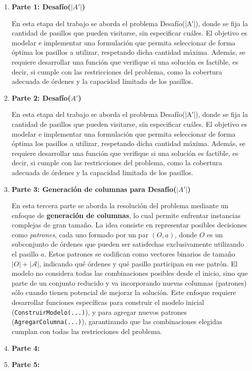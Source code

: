 \documentclass[a4paper,12pt]{article}
\begin{document}
\begin{enumerate}
    \item \textbf{Parte 1: Desafío(\(|A'|\))}
    
    En esta etapa del trabajo se aborda el problema Desafío(|A′|), donde se fija la cantidad de pasillos que pueden visitarse, sin especificar cuáles. El objetivo es modelar e implementar una formulación que permita seleccionar de forma óptima los pasillos a utilizar, respetando dicha cantidad máxima. Además, se requiere desarrollar una función que verifique si una solución es factible, es decir, si cumple con las restricciones del problema, como la cobertura adecuada de órdenes y la capacidad limitada de los pasillos.
    
    
    \item \textbf{Parte 2: Desafío(\(A'\))}
    
    En esta etapa del trabajo se aborda el problema Desafío(|A′|), donde se fija la cantidad de pasillos que pueden visitarse, sin especificar cuáles. El objetivo es modelar e implementar una formulación que permita seleccionar de forma óptima los pasillos a utilizar, respetando dicha cantidad máxima. Además, se requiere desarrollar una función que verifique si una solución es factible, es decir, si cumple con las restricciones del problema, como la cobertura adecuada de órdenes y la capacidad limitada de los pasillos.

    
    \item \textbf{Parte 3: Generación de columnas para Desafío(\(|A'|\)) }
    
    En esta tercera parte se aborda la resolución del problema mediante un enfoque de \textbf{generación de columnas}, lo cual permite enfrentar instancias complejas de gran tamaño. La idea consiste en representar posibles decisiones como \textit{patrones}, cada uno formado por un par $(O, a)$, donde $O$ es un subconjunto de órdenes que pueden ser satisfechas exclusivamente utilizando el pasillo $a$. Estos patrones se codifican como vectores binarios de tamaño $|O| + |\mathcal{A}|$, indicando qué órdenes y qué pasillo participan en ese patrón. El modelo no considera todas las combinaciones posibles desde el inicio, sino que parte de un conjunto reducido y va incorporando nuevas columnas (patrones) sólo cuando tienen potencial de mejorar la solución. Este enfoque requiere desarrollar funciones específicas para construir el modelo inicial (\texttt{ConstruirModelo(...)}), y para agregar nuevos patrones (\texttt{AgregarColumna(...)}), garantizando que las combinaciones elegidas cumplan con todas las restricciones del problema.


    \item \textbf{Parte 4: }

    

    \item \textbf{Parte 5: }
    
    
\end{enumerate}
\end{document}
